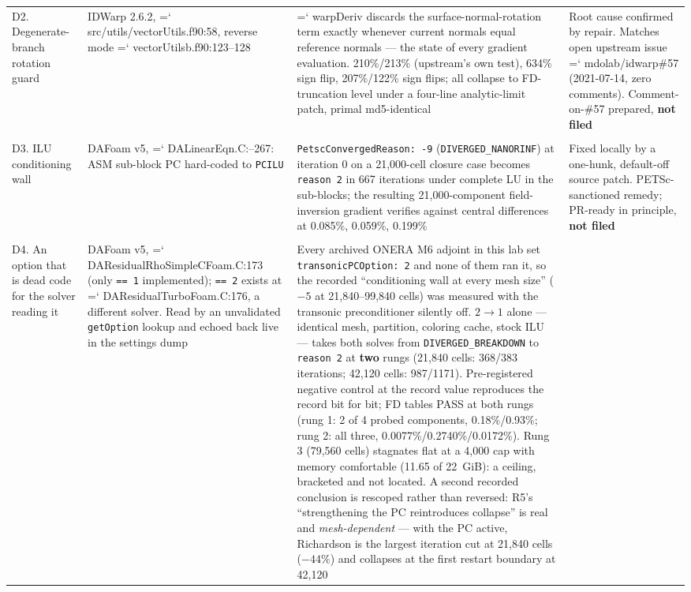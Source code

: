 \documentclass[11pt,a4paper]{article}
\newcommand{\artifact}[1]{{\small\ttfamily\hyphenchar\font=`\-\relax
  \def\_{\textunderscore\allowbreak}#1}}
\begin{document}
{\begin{longtable}{@{}L{2.4cm}L{3.1cm}L{5.9cm}L{3.2cm}@{}}
\addlinespace
D2. Degenerate-branch rotation guard
& IDWarp 2.6.2, \artifact{src/utils/vectorUtils.f90:58}, reverse mode \artifact{vectorUtils\_b.f90:123--128}
& \artifact{warpDeriv} discards the surface-normal-rotation term exactly whenever current normals equal reference normals --- the state of every gradient evaluation. 210\%/213\% (upstream's own test), 634\% sign flip, 207\%/122\% sign flips; all collapse to FD-truncation level under a four-line analytic-limit patch, primal md5-identical
& Root cause confirmed by repair. Matches open upstream issue \artifact{mdolab/idwarp\#57} (2021-07-14, zero comments). Comment-on-\#57 prepared, \textbf{not filed} \\
\addlinespace
{}\\
\addlinespace
D3. ILU conditioning wall
& DAFoam v5, \artifact{DALinearEqn.C:--267}: ASM sub-block PC hard-coded to \texttt{PCILU}
& \texttt{PetscConvergedReason: -9} (\texttt{DIVERGED\_NANORINF}) at iteration 0 on a 21{,}000-cell closure case becomes \texttt{reason 2} in 667 iterations under complete LU in the sub-blocks; the resulting 21{,}000-component field-inversion gradient verifies against central differences at 0.085\%, 0.059\%, 0.199\%
& Fixed locally by a one-hunk, default-off source patch. PETSc-sanctioned remedy; PR-ready in principle, \textbf{not filed} \\
\addlinespace
{}\\
\addlinespace
D4. An option that is dead code for the solver reading it
& DAFoam v5, \artifact{DAResidualRhoSimpleCFoam.C:173} (only \texttt{== 1} implemented); \texttt{== 2} exists at \artifact{DAResidualTurboFoam.C:176}, a different solver. Read by an unvalidated \texttt{getOption} lookup and echoed back live in the settings dump
& Every archived ONERA M6 adjoint in this lab set \texttt{transonicPCOption: 2} and none of them ran it, so the recorded ``conditioning wall at every mesh size'' (\(-5\) at 21{,}840--99{,}840 cells) was measured with the transonic preconditioner silently off. \(2\rightarrow1\) alone --- identical mesh, partition, coloring cache, stock ILU --- takes both solves from \texttt{DIVERGED\_BREAKDOWN} to \texttt{reason 2} at \textbf{two} rungs (21{,}840 cells: 368/383 iterations; 42{,}120 cells: 987/1171). Pre-registered negative control at the record value reproduces the record bit for bit; FD tables PASS at both rungs (rung 1: 2 of 4 probed components, 0.18\%/0.93\%; rung 2: all three, 0.0077\%/0.2740\%/0.0172\%). Rung 3 (79{,}560 cells) stagnates flat at a 4{,}000 cap with memory comfortable (11.65 of 22~GiB): a ceiling, bracketed and not located. A second recorded conclusion is rescoped rather than reversed: R5's ``strengthening the PC reintroduces collapse'' is real and \emph{mesh-dependent} --- with the PC active, Richardson is the largest iteration cut at 21{,}840 cells (\(-44\%\)) and collapses at the first restart boundary at 42{,}120

\end{longtable}}
\end{document}
